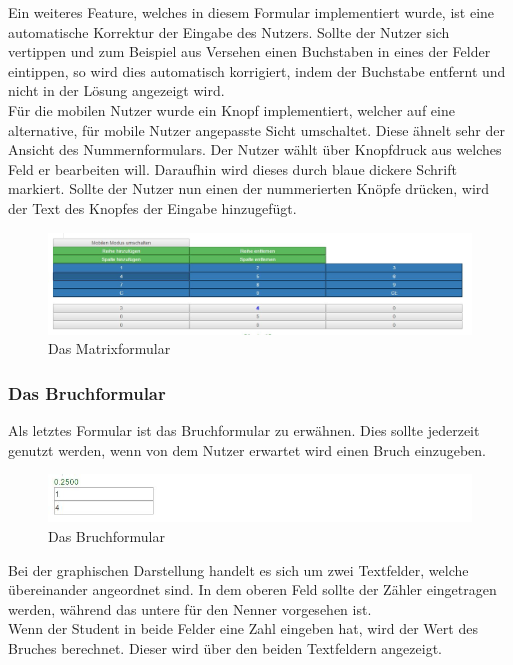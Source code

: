 Ein weiteres Feature, welches in diesem Formular implementiert wurde, ist eine automatische Korrektur der Eingabe des Nutzers. Sollte der Nutzer sich vertippen und zum Beispiel aus Versehen einen Buchstaben in eines der Felder eintippen, so wird dies automatisch korrigiert, indem der Buchstabe entfernt und nicht in der Lösung angezeigt wird. \\

Für die mobilen Nutzer wurde ein Knopf implementiert, welcher auf eine alternative, für mobile Nutzer angepasste Sicht umschaltet. Diese ähnelt sehr der Ansicht des Nummernformulars. Der Nutzer wählt über Knopfdruck aus welches Feld er bearbeiten will. Daraufhin wird dieses durch blaue dickere Schrift markiert. Sollte der Nutzer nun einen der nummerierten Knöpfe drücken, wird der Text des Knopfes der Eingabe hinzugefügt.


\begin{figure}[htp]     %
\centering
\includegraphics[width=1\textwidth]{bilder/MatrixMobile} 
\caption[Das Matrixformular]{Das Matrixformular}
\end{figure} 


\subsubsection{Das Bruchformular}

Als letztes Formular ist das Bruchformular zu erwähnen. Dies sollte jederzeit genutzt werden, wenn von dem Nutzer erwartet wird einen Bruch einzugeben.

\begin{figure}[htp]     %
\centering
\includegraphics[width=1\textwidth]{bilder/FractureForm} 
\caption[Das Bruchformular]{Das Bruchformular}
\end{figure} 

Bei der graphischen Darstellung handelt es sich um zwei Textfelder, welche übereinander angeordnet sind. In dem oberen Feld sollte der Zähler eingetragen werden, während das untere für den Nenner vorgesehen ist. \\
Wenn der Student in beide Felder eine Zahl eingeben hat, wird der Wert des Bruches berechnet. Dieser wird über den beiden Textfeldern angezeigt. \\

